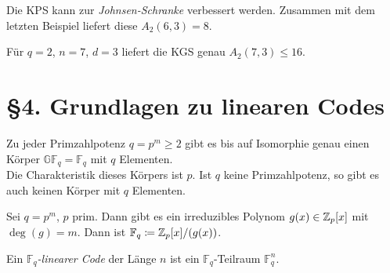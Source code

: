 \documentclass{cheat-sheet}
\newcommand{\F}{\mathbb{F}} %
\newcommand{\GF}{\mathbb{GF}} %
\newcommand{\floor}[1]{\lfloor #1 \rfloor} %
\begin{document}
\iffalse
\begin{bsp}
  $n = 6$, $q = 2$, $d = 3$. \\
  Singleton-Schranke: $A_2(6, 3) \leq 2^{6-3+1} = 2^4 = 16$ \\
  Kugelpackungsschranke: $A_2(6, 3) \leq \floor{\frac{\floor{2^6}}{\binom{6}{0} (2-1)^0 + \binom{6}{1} (2-1)^1}} = 9$
\end{bsp}
\fi

\begin{samepage}

\begin{bem}
  Die KPS kann zur \emph{Johnsen-Schranke} verbessert werden.
  Zusammen mit dem letzten Beispiel liefert diese $A_2(6, 3) = 8$.
\end{bem}

\begin{bsp}
  Für $q{=}2$, $n{=}7$, $d{=}3$ liefert die KGS genau $A_2(7,3) \leq 16$.
\end{bsp}

\section{§4. Grundlagen zu linearen Codes}

\end{samepage}


\begin{bem}
  Zu jeder Primzahlpotenz $q = p^m \geq 2$ gibt es bis auf Isomorphie genau einen Körper $\GF_q = \F_q$ mit $q$ Elementen. \\
  Die Charakteristik dieses Körpers ist $p$. Ist $q$ keine Primzahlpotenz, so gibt es auch keinen Körper mit $q$ Elementen.
\end{bem}

\begin{konstr}
  Sei $q = p^m$, $p$ prim. Dann gibt es ein irreduzibles Polynom $g(x) \in \mathbb{Z}_p [x]$ mit $\deg(g) = m$.
  Dann ist $\F_q \coloneqq \Z_p[x]/(g(x))$.
\end{konstr}



\begin{defn}
  Ein \emph{$\F_q$-linearer Code} der Länge $n$ ist ein $\F_q$-Teilraum $\F_q^n$.
\end{defn}
\end{document}
